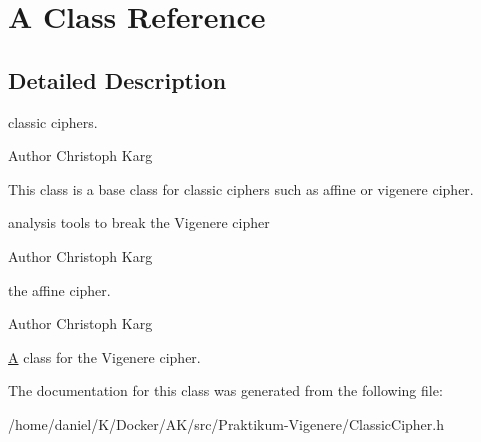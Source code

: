 \hypertarget{classA}{}\section{A Class Reference}
\label{classA}


\subsection{Detailed Description}
classic ciphers. \begin{DoxyAuthor}{Author}
Christoph Karg
\end{DoxyAuthor}
This class is a base class for classic ciphers such as affine or vigenere cipher.

analysis tools to break the Vigenere cipher \begin{DoxyAuthor}{Author}
Christoph Karg
\end{DoxyAuthor}
the affine cipher. \begin{DoxyAuthor}{Author}
Christoph Karg
\end{DoxyAuthor}
\hyperlink{classA}{A} class for the Vigenere cipher. 

The documentation for this class was generated from the following file\+:\begin{DoxyCompactItemize}
\item 
/home/daniel/\+K/\+Docker/\+A\+K/src/\+Praktikum-\/\+Vigenere/Classic\+Cipher.\+h\end{DoxyCompactItemize}
